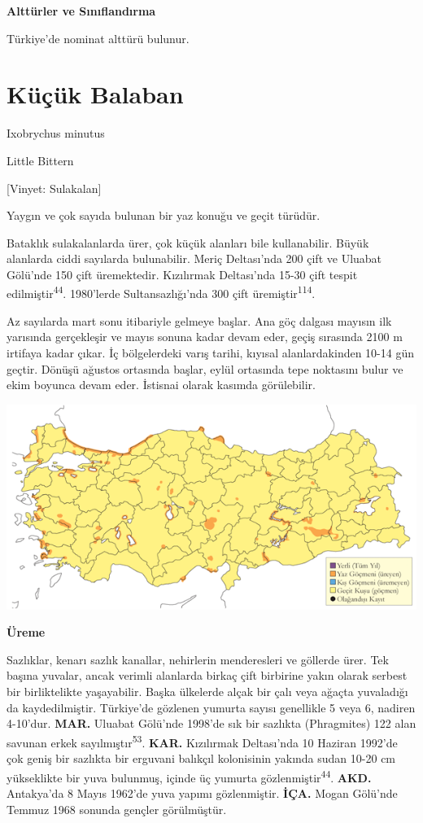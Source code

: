 \documentclass[
  letterpaper,
  DIV=11,
  numbers=noendperiod]{scrreprt}
\begin{document}
\textbf{Alttürler ve Sınıflandırma}

Türkiye'de nominat alttürü bulunur.

\section{Küçük Balaban}\label{kuxfcuxe7uxfck-balaban}

Ixobrychus minutus

Little Bittern

{[}Vinyet: Sulakalan{]}

Yaygın ve çok sayıda bulunan bir yaz konuğu ve geçit türüdür.

Bataklık sulakalanlarda ürer, çok küçük alanları bile kullanabilir.
Büyük alanlarda ciddi sayılarda bulunabilir. Meriç Deltası'nda 200 çift
ve Uluabat Gölü'nde 150 çift üremektedir. Kızılırmak Deltası'nda 15-30
çift tespit edilmiştir\textsuperscript{44}. 1980'lerde Sultansazlığı'nda
300 çift üremiştir\textsuperscript{114}.

Az sayılarda mart sonu itibariyle gelmeye başlar. Ana göç dalgası
mayısın ilk yarısında gerçekleşir ve mayıs sonuna kadar devam eder,
geçiş sırasında 2100 m irtifaya kadar çıkar. İç bölgelerdeki varış
tarihi, kıyısal alanlardakinden 10-14 gün geçtir. Dönüşü ağustos
ortasında başlar, eylül ortasında tepe noktasını bulur ve ekim boyunca
devam eder. İstisnai olarak kasımda görülebilir.

\includegraphics{images/harita_Page_065.png}

\textbf{Üreme}

Sazlıklar, kenarı sazlık kanallar, nehirlerin menderesleri ve göllerde
ürer. Tek başına yuvalar, ancak verimli alanlarda birkaç çift birbirine
yakın olarak serbest bir birliktelikte yaşayabilir. Başka ülkelerde
alçak bir çalı veya ağaçta yuvaladığı da kaydedilmiştir. Türkiye'de
gözlenen yumurta sayısı genellikle 5 veya 6, nadiren 4-10'dur.
\textbf{MAR.} Uluabat Gölü'nde 1998'de sık bir sazlıkta (Phragmites) 122
alan savunan erkek sayılmıştır\textsuperscript{53}. \textbf{KAR.}
Kızılırmak Deltası'nda 10 Haziran 1992'de çok geniş bir sazlıkta bir
erguvani balıkçıl kolonisinin yakında sudan 10-20 cm yükseklikte bir
yuva bulunmuş, içinde üç yumurta gözlenmiştir\textsuperscript{44}.
\textbf{AKD.} Antakya'da 8 Mayıs 1962'de yuva yapımı gözlenmiştir.
\textbf{İÇA.} Mogan Gölü'nde Temmuz 1968 sonunda gençler görülmüştür.
\end{document}
